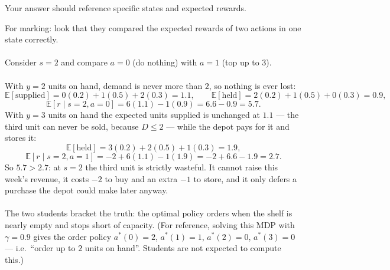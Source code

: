 \begin{enumerate}
Your answer should reference specific states and expected rewards.
\begin{solution}
For marking: look that they compared the expected rewards of two actions in one state correctly.
\\~\\
Consider $s=2$ and compare $a=0$ (do nothing) with $a=1$ (top up to $3$).
\\~\\
With $y=2$ units on hand, demand is never more than $2$, so nothing is ever lost:
\[
\mathbb{E}[\text{supplied}] = 0(0.2)+1(0.5)+2(0.3) = 1.1, \qquad
\mathbb{E}[\text{held}] = 2(0.2)+1(0.5)+0(0.3) = 0.9,
\]
\[
\mathbb{E}[r \mid s=2,a=0] = 6(1.1) - 1(0.9) = 6.6 - 0.9 = 5.7.
\]
With $y=3$ units on hand the expected units supplied is unchanged at $1.1$ --- the third unit can
never be sold, because $D \le 2$ --- while the depot pays for it and stores it:
\[
\mathbb{E}[\text{held}] = 3(0.2)+2(0.5)+1(0.3) = 1.9,
\]
\[
\mathbb{E}[r \mid s=2,a=1] = -2 + 6(1.1) - 1(1.9) = -2 + 6.6 - 1.9 = 2.7.
\]
So $5.7 > 2.7$: at $s=2$ the third unit is strictly wasteful. It cannot raise this week's revenue,
it costs $-2$ to buy and an extra $-1$ to store, and it only defers a purchase the depot could
make later anyway.
\\~\\
The two students bracket the truth: the optimal policy orders when the shelf is nearly empty and
stops short of capacity. (For reference, solving this MDP with $\gamma = 0.9$ gives the order
policy $a^*(0)=2$, $a^*(1)=1$, $a^*(2)=0$, $a^*(3)=0$ --- i.e.\ ``order up to $2$ units on hand''.
Students are not expected to compute this.)
\end{solution}
\end{enumerate}
